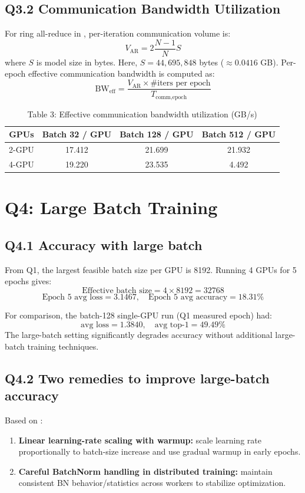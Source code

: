 \documentclass[11pt, letterpaper]{article}
\begin{document}
\subsection*{Q3.2 Communication Bandwidth Utilization}
For ring all-reduce in \cite{patarasuk2009}, per-iteration communication volume is:
\[
V_{\text{AR}} = 2\frac{N-1}{N}S
\]
where $S$ is model size in bytes. Here, $S=44{,}695{,}848$ bytes ($\approx 0.0416$ GB).  
Per-epoch effective communication bandwidth is computed as:
\[
\text{BW}_{\text{eff}}=\frac{V_{\text{AR}}\times \#\text{iters per epoch}}{T_{\text{comm,epoch}}}
\]

\begin{table}[h]
\centering
\caption{Table 3: Effective communication bandwidth utilization (GB/s)}
\label{tab:q3_2}
\begin{tabular}{c|c|c|c}
\toprule
GPUs & Batch 32 / GPU & Batch 128 / GPU & Batch 512 / GPU \\
\midrule
2-GPU & 17.412 & 21.699 & 21.932 \\
4-GPU & 19.220 & 23.535 & 4.492 \\
\bottomrule
\end{tabular}
\end{table}

\section{Q4: Large Batch Training}
\subsection*{Q4.1 Accuracy with large batch}
From Q1, the largest feasible batch size per GPU is 8192.  
Running 4 GPUs for 5 epochs gives:
\[
\text{Effective batch size}=4\times8192=32768
\]
\[
\text{Epoch 5 avg loss}=3.1467,\quad
\text{Epoch 5 avg accuracy}=18.31\%
\]

For comparison, the batch-128 single-GPU run (Q1 measured epoch) had:
\[
\text{avg loss}=1.3840,\quad \text{avg top-1}=49.49\%
\]
The large-batch setting significantly degrades accuracy without additional large-batch training techniques.

\subsection*{Q4.2 Two remedies to improve large-batch accuracy}
Based on \cite{goyal2017}:
\begin{enumerate}
    \item \textbf{Linear learning-rate scaling with warmup:} scale learning rate proportionally to batch-size increase and use gradual warmup in early epochs.
    \item \textbf{Careful BatchNorm handling in distributed training:} maintain consistent BN behavior/statistics across workers to stabilize optimization.
\end{enumerate}
\end{document}
